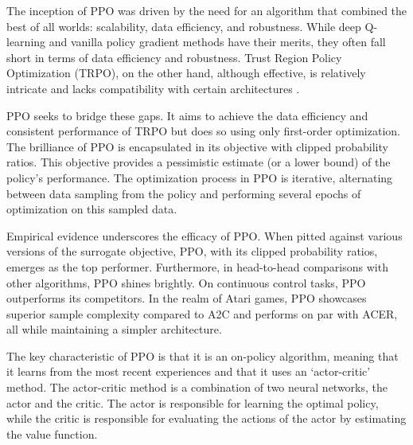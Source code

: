 The inception of PPO was driven by the need for an algorithm that combined the best of all worlds: scalability, data efficiency, and robustness. While deep Q-learning and vanilla policy gradient methods have their merits, they often fall short in terms of data efficiency and robustness. Trust Region Policy Optimization (TRPO), on the other hand, although effective, is relatively intricate and lacks compatibility with certain architectures \cite{engstrom2020implementation}.

PPO seeks to bridge these gaps. It aims to achieve the data efficiency and consistent performance of TRPO but does so using only first-order optimization. The brilliance of PPO is encapsulated in its objective with clipped probability ratios. This objective provides a pessimistic estimate (or a lower bound) of the policy's performance. The optimization process in PPO is iterative, alternating between data sampling from the policy and performing several epochs of optimization on this sampled data.

Empirical evidence underscores the efficacy of PPO. When pitted against various versions of the surrogate objective, PPO, with its clipped probability ratios, emerges as the top performer. Furthermore, in head-to-head comparisons with other algorithms, PPO shines brightly. On continuous control tasks, PPO outperforms its competitors. In the realm of Atari games, PPO showcases superior sample complexity compared to A2C and performs on par with ACER, all while maintaining a simpler architecture.

The key characteristic of PPO is that it is an on-policy algorithm, meaning that it learns from the most recent experiences and that it uses an `actor-critic' method. The actor-critic method is a combination of two neural networks, the actor and the critic. The actor is responsible for learning the optimal policy, while the critic is responsible for evaluating the actions of the actor by estimating the value function.  

